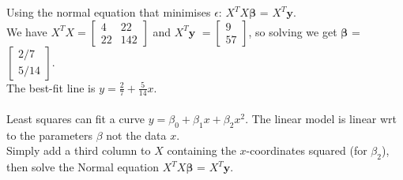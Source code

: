 \documentclass[../linear-algebra.tex]{subfiles}
\begin{document}
Using the normal equation that minimises $\epsilon$: $X^TX$$\mathbf{\beta}$ = $X^T$$\mathbf{y}$.\\
We have $X^TX = \begin{bmatrix} 4 & 22 \\ 22 & 142 \end{bmatrix}$ and $X^T$$\mathbf{y}$ $= \begin{bmatrix} 9 \\ 57 \end{bmatrix}$, so solving we get $\mathbf{\beta}$ = $\begin{bmatrix} 2/7 \\ 5/14 \end{bmatrix}$.\\
The best-fit line is $y = \frac{2}{7} + \frac{5}{14}x$.\\
\\
Least squares can fit a curve $y = \beta_0 + \beta_1x + \beta_2x^2$.
The linear model is linear wrt to the parameters $\beta$ not the data $x$.\\
Simply add a third column to $X$ containing the $x$-coordinates squared (for $\beta_2$), then solve the Normal equation $X^TX$$\mathbf{\beta}$ = $X^T$$\mathbf{y}$.
\end{document}
